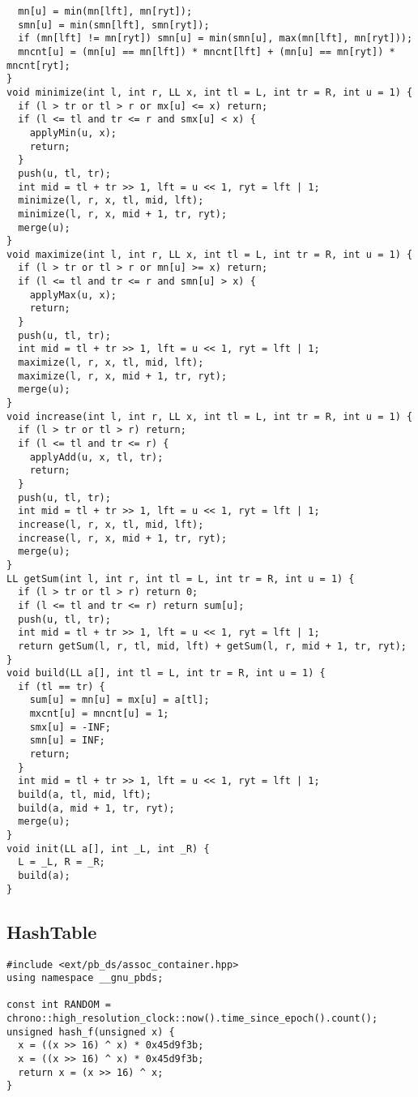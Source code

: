 \documentclass[FSZ,a4paper,onesided]{article}
\begin{document}
\begin{multicols*}{\COLS}
\begin{lstlisting}
  mn[u] = min(mn[lft], mn[ryt]);
  smn[u] = min(smn[lft], smn[ryt]);
  if (mn[lft] != mn[ryt]) smn[u] = min(smn[u], max(mn[lft], mn[ryt]));
  mncnt[u] = (mn[u] == mn[lft]) * mncnt[lft] + (mn[u] == mn[ryt]) * mncnt[ryt];
}
void minimize(int l, int r, LL x, int tl = L, int tr = R, int u = 1) {
  if (l > tr or tl > r or mx[u] <= x) return;
  if (l <= tl and tr <= r and smx[u] < x) {
    applyMin(u, x);
    return;
  }
  push(u, tl, tr);
  int mid = tl + tr >> 1, lft = u << 1, ryt = lft | 1;
  minimize(l, r, x, tl, mid, lft);
  minimize(l, r, x, mid + 1, tr, ryt);
  merge(u);
}
void maximize(int l, int r, LL x, int tl = L, int tr = R, int u = 1) {
  if (l > tr or tl > r or mn[u] >= x) return;
  if (l <= tl and tr <= r and smn[u] > x) {
    applyMax(u, x);
    return;
  }
  push(u, tl, tr);
  int mid = tl + tr >> 1, lft = u << 1, ryt = lft | 1;
  maximize(l, r, x, tl, mid, lft);
  maximize(l, r, x, mid + 1, tr, ryt);
  merge(u);
}
void increase(int l, int r, LL x, int tl = L, int tr = R, int u = 1) {
  if (l > tr or tl > r) return;
  if (l <= tl and tr <= r) {
    applyAdd(u, x, tl, tr);
    return;
  }
  push(u, tl, tr);
  int mid = tl + tr >> 1, lft = u << 1, ryt = lft | 1;
  increase(l, r, x, tl, mid, lft);
  increase(l, r, x, mid + 1, tr, ryt);
  merge(u);
}
LL getSum(int l, int r, int tl = L, int tr = R, int u = 1) {
  if (l > tr or tl > r) return 0;
  if (l <= tl and tr <= r) return sum[u];
  push(u, tl, tr);
  int mid = tl + tr >> 1, lft = u << 1, ryt = lft | 1;
  return getSum(l, r, tl, mid, lft) + getSum(l, r, mid + 1, tr, ryt);
}
void build(LL a[], int tl = L, int tr = R, int u = 1) {
  if (tl == tr) {
    sum[u] = mn[u] = mx[u] = a[tl];
    mxcnt[u] = mncnt[u] = 1;
    smx[u] = -INF;
    smn[u] = INF;
    return;
  }
  int mid = tl + tr >> 1, lft = u << 1, ryt = lft | 1;
  build(a, tl, mid, lft);
  build(a, mid + 1, tr, ryt);
  merge(u);
}
void init(LL a[], int _L, int _R) {
  L = _L, R = _R;
  build(a);
}
\end{lstlisting}
\subsection{HashTable}
\begin{lstlisting}
#include <ext/pb_ds/assoc_container.hpp>
using namespace __gnu_pbds;

const int RANDOM = chrono::high_resolution_clock::now().time_since_epoch().count();
unsigned hash_f(unsigned x) {
  x = ((x >> 16) ^ x) * 0x45d9f3b;
  x = ((x >> 16) ^ x) * 0x45d9f3b;
  return x = (x >> 16) ^ x;
}


\end{lstlisting}
\end{multicols*}
\end{document}
